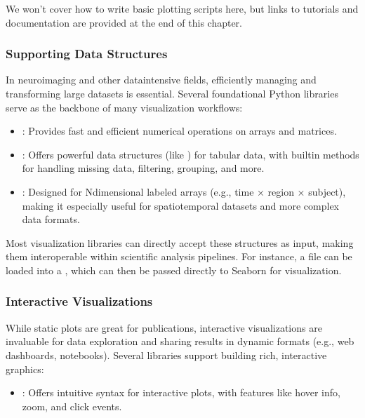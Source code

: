 \documentclass[letterpaper,10pt,english]{jupyterBook}
\begin{document}
\sphinxAtStartPar
We won’t cover how to write basic plotting scripts here, but links to tutorials and documentation are provided at the end of this chapter.


\subsubsection{Supporting Data Structures}
\label{\detokenize{chapters/03/03b_visualization-tools:supporting-data-structures}}
\sphinxAtStartPar
In neuroimaging and other data\sphinxhyphen{}intensive fields, efficiently managing and transforming large datasets is essential. Several foundational Python libraries serve as the backbone of many visualization workflows:
\begin{itemize}
\item {} 
\sphinxAtStartPar
{}: Provides fast and efficient numerical operations on arrays and matrices.

\item {} 
\sphinxAtStartPar
{}: Offers powerful data structures (like ) for tabular data, with built\sphinxhyphen{}in methods for handling missing data, filtering, grouping, and more.

\item {} 
\sphinxAtStartPar
{}: Designed for N\sphinxhyphen{}dimensional labeled arrays (e.g., time × region × subject), making it especially useful for spatiotemporal datasets and more complex data formats.

\end{itemize}

\sphinxAtStartPar
Most visualization libraries can directly accept these structures as input, making them interoperable within scientific analysis pipelines. For instance, a  file can be loaded into a , which can then be passed directly to Seaborn for visualization.


\subsubsection{Interactive Visualizations}
\label{\detokenize{chapters/03/03b_visualization-tools:interactive-visualizations}}
\sphinxAtStartPar
While static plots are great for publications, interactive visualizations are invaluable for data exploration and sharing results in dynamic formats (e.g., web dashboards, notebooks). Several libraries support building rich, interactive graphics:
\begin{itemize}
\item {} 
\sphinxAtStartPar
{}: Offers intuitive syntax for interactive plots, with features like hover info, zoom, and click events.

\end{itemize}
\end{document}
